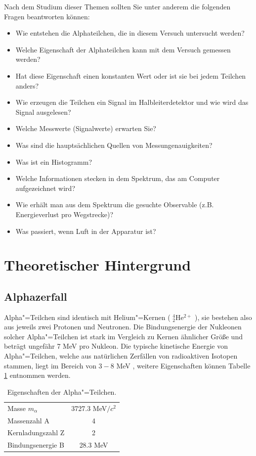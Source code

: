 Nach dem Studium dieser Themen sollten Sie unter anderem die folgenden Fragen beantworten können:
%
\begin{itemize}[itemsep=0pt]
	\item Wie entstehen die Alphateilchen, die in diesem Versuch untersucht werden?
	\item Welche Eigenschaft der Alphateilchen kann mit dem Versuch gemessen werden? 
	\item Hat diese Eigenschaft einen konstanten Wert oder ist sie bei jedem Teilchen anders?
	\item Wie erzeugen die Teilchen ein Signal im Halbleiterdetektor und wie wird das Signal ausgelesen?
	\item Welche Messwerte (Signalwerte) erwarten Sie?
	\item Was sind die hauptsächlichen Quellen von Messungenauigkeiten?
	\item Was ist ein Histogramm?
	\item Welche Informationen stecken in dem Spektrum, das am Computer aufgezeichnet wird?
	\item Wie erhält man aus dem Spektrum die gesuchte Observable (z.B. Energieverlust pro Wegstrecke)?
	\item Was passiert, wenn Luft in der Apparatur ist?
\end{itemize}
%
\section{Theoretischer Hintergrund}
\label{sec:theory}
%
\subsection{Alphazerfall}
Alpha"=Teilchen sind identisch mit Helium"=Kernen ( $^4_2$He$^{2+}$ ), sie bestehen also aus jeweils zwei Protonen und Neutronen. Die Bindungsenergie der Nukleonen solcher Alpha"=Teilchen ist stark im Vergleich zu Kernen ähnlicher Größe und beträgt ungefähr 7 MeV pro Nukleon. Die typische kinetische Energie von Alpha"=Teilchen, welche aus natürlichen Zerfällen von radioaktiven Isotopen stammen, liegt im Bereich von $3-8$ MeV \cite{povh-rith}, weitere Eigenschaften können Tabelle \ref{tab:alpha} entnommen werden.
\begin{table}[h]
	\centering
	\begin{tabular}{lc}
		Masse $m_\alpha$    & 3727.3 MeV$/c^{2}$ \\
		Massenzahl A        & 4    \\
		Kernladungszahl Z   & 2    \\
		Bindungsenergie B   & 28.3 MeV \\
	\end{tabular}
	\caption{Eigenschaften der Alpha"=Teilchen.}\label{tab:alpha}
\end{table}

